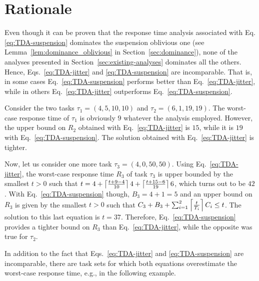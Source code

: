 \section{Rationale}
\label{sec:rationale}

Even though it can be proven that the response time analysis associated with Eq.\eqref{eq:TDA-suspension} dominates the suspension oblivious one (see Lemma~\ref{lem:dominance_oblivious} in Section~\ref{sec:dominance}), none of the analyses presented in Section~\ref{sec:existing-analyses} dominates all the others. Hence, Eqs.~\eqref{eq:TDA-jitter} and \eqref{eq:TDA-suspension} are incomparable. That is, in some cases Eq.~\eqref{eq:TDA-suspension} performs better than Eq.~\eqref{eq:TDA-jitter}, while in others Eq.~\eqref{eq:TDA-jitter} outperforms Eq.~\eqref{eq:TDA-suspension}.

\begin{example} 
\label{ex:rationale_1}  
Consider the two tasks $\tau_1 = (4, 5, 10, 10)$ and $\tau_2 =(6, 1, 19, 19)$. The worst-case response time of $\tau_1$ is obviously $9$ whatever the analysis employed. However, the upper bound on $R_2$ obtained with Eq.~\eqref{eq:TDA-jitter} is $15$, while it is $19$ with Eq.~\eqref{eq:TDA-suspension}. The solution obtained with Eq.~\eqref{eq:TDA-jitter} is tighter.

Now, let us consider one more task $\tau_3 = (4, 0, 50, 50)$. Using Eq.~\eqref{eq:TDA-jitter}, the worst-case response time $R_3$ of task $\tau_3$ is upper bounded by the smallest $t>0$ such that
$t = 4 +\left\lceil{ \frac{t + 9 - 4}{10} }\right\rceil 4 +\left\lceil{ \frac{t + 15 - 6}{19} }\right\rceil 6$, which turns out to be $42$. With Eq.~\eqref{eq:TDA-suspension} though, $B_3 = 4+1 = 5$ and an upper bound on $R_3$ is given by the smallest $t>0$ such that 
$C_3 + B_3 + \sum_{i=1}^{2}\left\lceil{\frac{t}{T_i}}\right\rceil C_i \leq t$. The solution to this last equation is $t=37$. Therefore, Eq.~\eqref{eq:TDA-suspension} provides a tighter bound on $R_3$ than Eq.~\eqref{eq:TDA-jitter}, while the opposite was true for $\tau_2$.
\hfill\myendproof
\end{example}

In addition to the fact that Eqs.~\eqref{eq:TDA-jitter} and \eqref{eq:TDA-suspension} are incomparable, there are task sets for which both equations overestimate the worst-case response time, e.g., in the following example.
 
